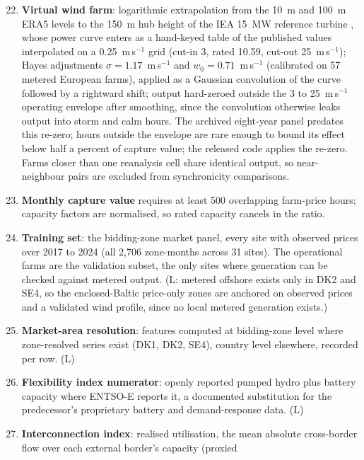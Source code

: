 \begin{enumerate}\setcounter{enumi}{21}
    \item \textbf{Virtual wind farm}: logarithmic extrapolation from the
    10~m and 100~m ERA5 levels to the 150~m hub height of the IEA 15~MW
    reference turbine \cite{Gaertner2020}, whose power curve enters as a
    hand-keyed table of the published values interpolated on a
    0.25~m\,s$^{-1}$ grid (cut-in 3, rated 10.59, cut-out 25~m\,s$^{-1}$);
    Hayes adjustments $\sigma = 1.17$~m\,s$^{-1}$ and
    $w_0 = 0.71$~m\,s$^{-1}$ (calibrated on 57 metered European farms),
    applied as a Gaussian convolution of the curve followed by a rightward
    shift; output hard-zeroed outside the 3 to 25~m\,s$^{-1}$ operating
    envelope after smoothing, since the convolution otherwise leaks output
    into storm and calm hours. The archived eight-year panel predates this
    re-zero; hours outside the envelope are rare enough to bound its effect
    below half a percent of capture value; the released code applies the re-zero.
    Farms closer than one reanalysis cell share identical output, so
    near-neighbour pairs are excluded from synchronicity comparisons.
    \item \textbf{Monthly capture value} requires at least 500 overlapping
    farm-price hours; capacity factors are normalised, so rated capacity
    cancels in the ratio.
    \item \textbf{Training set}: the bidding-zone market panel, every site
    with observed prices over 2017 to 2024 (all 2,706 zone-months across 31
    sites). The operational farms are the validation subset, the only sites
    where generation can be checked against metered output. (L: metered
    offshore exists only in DK2 and SE4, so the enclosed-Baltic price-only
    zones are anchored on observed prices and a validated wind profile, since no local
    metered generation exists.)
    \item \textbf{Market-area resolution}: features computed at bidding-zone
    level where zone-resolved series exist (DK1, DK2, SE4), country level
    elsewhere, recorded per row. (L)
    \item \textbf{Flexibility index numerator}: openly reported pumped
    hydro plus battery capacity where ENTSO-E reports it, a documented
    substitution for the predecessor's proprietary battery and
    demand-response data. (L)
    \item \textbf{Interconnection index}: realised utilisation, the mean
    absolute cross-border flow over each external border's capacity (proxied

\end{enumerate}
